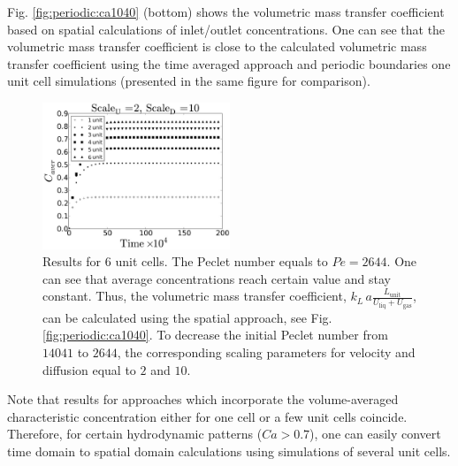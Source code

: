 \documentclass[review,12pt]{elsarticle}
\newcommand{\vol}{k_L\,a}
\newcommand{\lunit}{L_{\mathrm{unit}}}
\newcommand{\uliq}{U_{\mathrm{liq}}}
\newcommand{\ugas}{U_{\mathrm{gas}}}
\newcommand{\volnondim}{\vol \frac{\lunit}{\uliq+\ugas}}
\begin{document}
Fig. \ref{fig:periodic:ca1040}
(bottom) shows the volumetric mass transfer coefficient based on spatial calculations of
inlet/outlet concentrations. One can see that the volumetric mass transfer coefficient is close to
the calculated volumetric mass transfer coefficient using the time averaged approach and periodic
boundaries one unit cell simulations (presented in the same figure for comparison).
\begin{figure}[htb!]
\begin{center}
\includegraphics[width=0.5\textwidth]{aver_units6scaleu2scaled5.eps}
\end{center}
\caption{Results for $6$ unit cells. The Peclet number equals to $Pe=2644$.
One can see that average concentrations reach certain value and stay constant.
Thus, the volumetric mass transfer coefficient, $\volnondim$, can be
calculated using the spatial approach, see Fig.
\ref{fig:periodic:ca1040}. {\color{red}To decrease the initial Peclet number from $14041$ to $2644$, the corresponding scaling parameters for velocity and diffusion equal to $2$ and $10$.}
\label{fig:6:units:ca1040}}
\end{figure}
Note
that results for approaches which incorporate the volume-averaged characteristic concentration either for one cell or a few unit cells coincide. Therefore, for certain hydrodynamic patterns ($Ca>0.7$), one can
easily convert time domain to spatial domain calculations using simulations of several unit cells.
\end{document}
